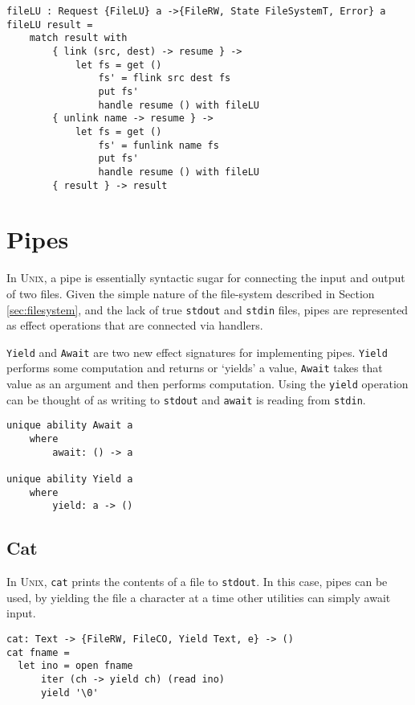 \documentclass[logo,bsc,singlespacing,parskip]{infthesis}
\begin{document}
\begin{lstlisting}[language=unison]
fileLU : Request {FileLU} a ->{FileRW, State FileSystemT, Error} a
fileLU result =
    match result with
        { link (src, dest) -> resume } ->
            let fs = get ()
                fs' = flink src dest fs
                put fs'
                handle resume () with fileLU
        { unlink name -> resume } ->
            let fs = get ()
                fs' = funlink name fs
                put fs'
                handle resume () with fileLU
        { result } -> result
\end{lstlisting}

\section{Pipes}

In \textsc{Unix}, a pipe is essentially syntactic sugar for connecting the input
and output of two files. Given the simple nature of the file-system described
in Section \ref{sec:filesystem}, and the lack of true \texttt{stdout} and
\texttt{stdin} files, pipes are represented as effect operations that are
connected via handlers.

\texttt{Yield} and \texttt{Await} are two new effect signatures for
implementing pipes. \texttt{Yield} performs some computation and returns or
`yields' a value, \texttt{Await} takes that value as an argument and then
performs computation. Using the \texttt{yield} operation can be thought of as
writing to \texttt{stdout} and \texttt{await} is reading from \texttt{stdin}.

\begin{lstlisting}[language=unison]
unique ability Await a
    where
        await: () -> a

unique ability Yield a
    where
        yield: a -> ()
\end{lstlisting}

\subsection{Cat}
In \textsc{Unix}, \texttt{cat} prints the contents of a file to
\texttt{stdout}. In this case, pipes can be used, by yielding the file a
character at a time other utilities can simply await input.  

\begin{lstlisting}[language=unison]
cat: Text -> {FileRW, FileCO, Yield Text, e} -> ()
cat fname = 
  let ino = open fname
      iter (ch -> yield ch) (read ino)
      yield '\0'

\end{lstlisting}
\end{document}
